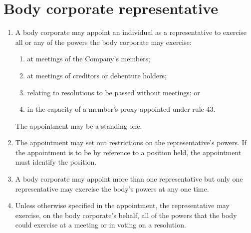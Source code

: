 \section{Body corporate representative}

\begin{enumerate}[label=(\alph*)]
    \item A body corporate may appoint an individual as a representative to exercise all or any of the powers the body corporate may exercise:
    \begin{enumerate}[label=(\roman*)]
        \item at meetings of the Company's members;
        \item at meetings of creditors or debenture holders;
        \item relating to resolutions to be passed without meetings; or
        \item in the capacity of a member's proxy appointed under rule 43.
    \end{enumerate}
    
    The appointment may be a standing one.
    
    \item The appointment may set out restrictions on the representative's powers. If the appointment is to be by reference to a position held, the appointment must identify the position.
    
    \item A body corporate may appoint more than one representative but only one representative may exercise the body's powers at any one time.
    
    \item Unless otherwise specified in the appointment, the representative may exercise, on the body corporate's behalf, all of the powers that the body could exercise at a meeting or in voting on a resolution.
\end{enumerate} 